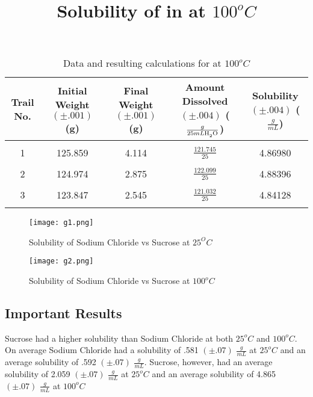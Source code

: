 \documentclass{article}
\begin{document}
\begin{table}[H]
	\centering
	\small
	\title{Solubility of  in  at $100^o C$}
	\tabcolsep=0.11cm 
	\begin{tabular}{ccccc} \\
	Trail No. & Initial Weight $(\pm .001)$ (g) & Final Weight $(\pm .001)$ (g) & Amount Dissolved $(\pm .004)$ ($\frac{g}{25mL \ce{H_2O}}$) & Solubility $(\pm .004)$ ($\frac{g}{mL}$) \\ \hline \\
	1 & 125.859 & 4.114 & $\frac{121.745}{25}$ & 4.86980 \\\\
	2 & 124.974 & 2.875 & $\frac{122.099}{25}$ & 4.88396 \\\\
	3 & 123.847 & 2.545 & $\frac{121.032}{25}$ & 4.84128 \\\\
	\end{tabular}
	\caption{Data and resulting calculations for  at $100^o C$} 
	\end{table}
\begin{figure}[H]
	\centering
	\texttt{[image: g1.png]}
	\caption{Solubility of Sodium Chloride vs Sucrose at $25^O C$}
\end{figure}
\begin{figure}[H]
	\centering
	\texttt{[image: g2.png]}
	\caption{Solubility of Sodium Chloride vs Sucrose at $100^o C$}
\end{figure}
\subsection*{Important Results}
Sucrose had a higher solubility than Sodium Chloride at both $25^o C$ and $100^o C$. On average Sodium Chloride had a solubility of .581 $(\pm .07)$ $\frac{g}{mL}$ at $25^o C$ and an average solubility of .592 $(\pm .07)$ $\frac{g}{mL}$. Sucrose, however, had an average solubility of 2.059 $(\pm .07)$ $\frac{g}{mL}$ at $25^o C$ and an average solubility of 4.865  $(\pm .07)$ $\frac{g}{mL}$ at $100^o C$
\end{document}
